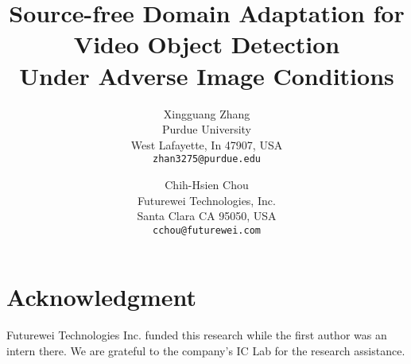\documentclass[10pt,twocolumn,letterpaper]{article}
\title{Source-free Domain Adaptation for Video Object Detection \\
Under Adverse Image Conditions}
\author{Xingguang Zhang\\
Purdue University\\
West Lafayette, In 47907, USA\\
{\tt\small zhan3275@purdue.edu}
\and
Chih-Hsien Chou\\
Futurewei Technologies, Inc.\\
Santa Clara CA 95050, USA\\
{\tt\small cchou@futurewei.com}
}
\begin{document}
\maketitle
    







\section{Acknowledgment}
Futurewei Technologies Inc. funded this research while the
first author was an intern there. We are grateful to the company’s
IC Lab for the research assistance.


{
    \small
    
    
}

% 
\end{document}
